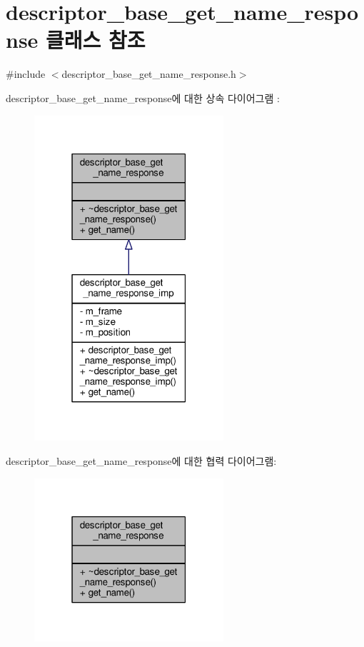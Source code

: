 \hypertarget{classavdecc__lib_1_1descriptor__base__get__name__response}{}\section{descriptor\+\_\+base\+\_\+get\+\_\+name\+\_\+response 클래스 참조}
\label{classavdecc__lib_1_1descriptor__base__get__name__response}


{\ttfamily \#include $<$descriptor\+\_\+base\+\_\+get\+\_\+name\+\_\+response.\+h$>$}



descriptor\+\_\+base\+\_\+get\+\_\+name\+\_\+response에 대한 상속 다이어그램 \+: 
\nopagebreak
\begin{figure}[H]
\begin{center}
\leavevmode
\includegraphics[width=199pt]{classavdecc__lib_1_1descriptor__base__get__name__response__inherit__graph}
\end{center}
\end{figure}


descriptor\+\_\+base\+\_\+get\+\_\+name\+\_\+response에 대한 협력 다이어그램\+:
\nopagebreak
\begin{figure}[H]
\begin{center}
\leavevmode
\includegraphics[width=199pt]{classavdecc__lib_1_1descriptor__base__get__name__response__coll__graph}
\end{center}
\end{figure}
